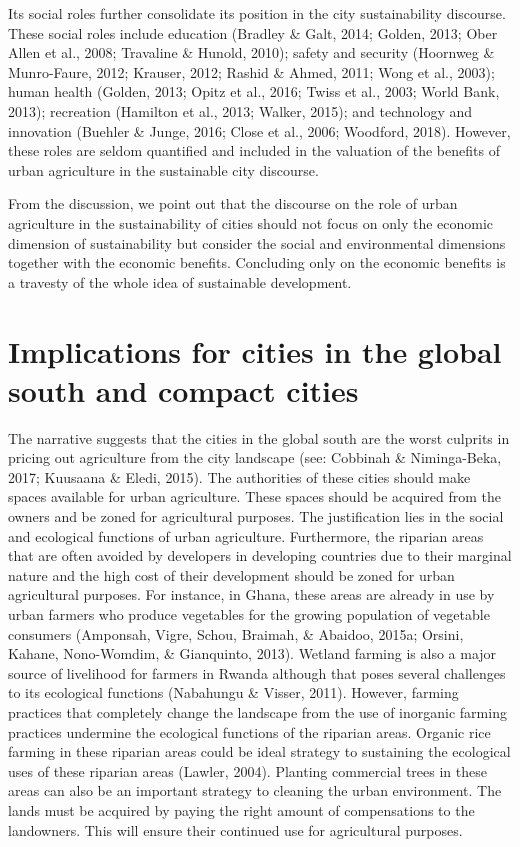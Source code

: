 Its social roles further consolidate its position in the city sustainability discourse. These social roles include education (Bradley \& Galt, 2014; Golden, 2013; Ober Allen et al., 2008; Travaline \& Hunold, 2010); safety and security (Hoornweg \& Munro-Faure, 2012; Krauser, 2012; Rashid \& Ahmed, 2011; Wong et al., 2003); human health (Golden, 2013; Opitz et al., 2016; Twiss et al., 2003; World Bank, 2013); recreation (Hamilton et al., 2013; Walker, 2015); and technology and innovation (Buehler \& Junge, 2016; Close et al., 2006; Woodford, 2018). However, these roles are seldom quantified and included in the valuation of the benefits of urban agriculture in the sustainable city discourse.

From the discussion, we point out that the discourse on the role of urban agriculture in the sustainability of cities should not focus on only the economic dimension of sustainability but consider the social and environmental dimensions together with the economic benefits. Concluding only on the economic benefits is a travesty of the whole idea of sustainable development.

\section{Implications for cities in the global south and compact cities}

The narrative suggests that the cities in the global south are the worst culprits in pricing out agriculture from the city landscape (see: Cobbinah \& Niminga-Beka, 2017; Kuusaana \& Eledi, 2015). The authorities of these cities should make spaces available for urban agriculture. These spaces should be acquired from the owners and be zoned for agricultural purposes. The justification lies in the social and ecological functions of urban agriculture. Furthermore, the riparian areas that are often avoided by developers in developing countries due to their marginal nature and the high cost of their development should be zoned for urban agricultural purposes. For instance, in Ghana, these areas are already in use by urban farmers who produce vegetables for the growing population of vegetable consumers (Amponsah, Vigre, Schou, Braimah, \& Abaidoo, 2015a; Orsini, Kahane, Nono-Womdim, \& Gianquinto, 2013). Wetland farming is also a major source of livelihood for farmers in Rwanda although that poses several challenges to its ecological functions (Nabahungu \& Visser, 2011). However, farming practices that completely change the landscape from the use of inorganic farming practices undermine the ecological functions of the riparian areas. Organic rice farming in these riparian areas could be ideal strategy to sustaining the ecological uses of these riparian areas (Lawler, 2004). Planting commercial trees in these areas can also be an important strategy to cleaning the urban environment. The lands must be acquired by paying the right amount of compensations to the landowners. This will ensure their continued use for agricultural purposes.

